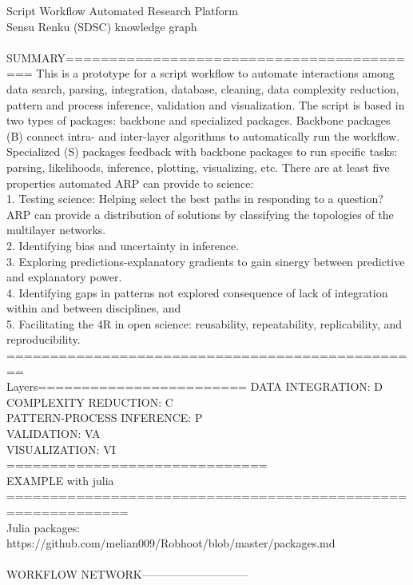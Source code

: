 \documentclass[english,12pt]{article}
\begin{document}
\newpage
Script Workflow Automated Research Platform \\
Sensu Renku (SDSC) knowledge graph \\
 \\
SUMMARY==========================================
This is a prototype for a script workflow to automate interactions among data search, parsing, integration, database, cleaning, data complexity reduction, pattern and process inference, validation and visualization. The script is based in two types of packages: backbone and specialized packages. Backbone packages (B) connect intra- and inter-layer algorithms to automatically run the workflow. Specialized (S) packages feedback with backbone packages to run specific tasks: parsing, likelihoods, inference, plotting, visualizing, etc. There are at least five properties automated ARP can provide to science:  \\
1. Testing science: Helping select the best paths in responding to a question? ARP can provide a distribution of solutions by classifying the topologies of the multilayer networks. \\
2. Identifying bias and uncertainty in inference. \\
3. Exploring predictions-explanatory gradients to gain sinergy between predictive and explanatory power. \\
4. Identifying gaps in patterns not explored consequence of lack of integration within and between disciplines, and \\
5. Facilitating the 4R in open science: reusability, repeatability, replicability, and reproducibility. \\
================================================
 \\
Layers========================
DATA INTEGRATION: D \\
COMPLEXITY REDUCTION: C \\
PATTERN-PROCESS INFERENCE: P \\
VALIDATION: VA \\
VISUALIZATION: VI \\
==============================
 \\
EXAMPLE with julia ============================================================ \\
Julia packages: \\
https://github.com/melian009/Robhoot/blob/master/packages.md \\
 \\
WORKFLOW NETWORK----------------------------- \\
\end{document}
